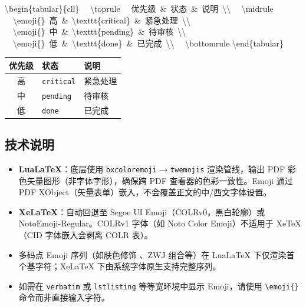 \documentclass[redline, titleindent, zhlineskip]{gbt9704}
\begin{document}
\begin{center}
\begin{minipage}[t]{0.52\textwidth}
\raggedright\small\ttfamily
\textbackslash begin\{tabular\}\{cll\}\newline
\ \ \textbackslash toprule\newline
\ \ 优先级\ \&\ 状态\ \&\ 说明\ \textbackslash\textbackslash\newline
\ \ \textbackslash midrule\newline
\ \ \textbackslash emoji\{\}\ 高\ \&\ \textbackslash texttt\{critical\}\ \&\ 紧急处理\ \textbackslash\textbackslash\newline
\ \ \textbackslash emoji\{\}\ 中\ \&\ \textbackslash texttt\{pending\}\ \&\ 待审核\ \textbackslash\textbackslash\newline
\ \ \textbackslash emoji\{\}\ 低\ \&\ \textbackslash texttt\{done\}\ \&\ 已完成\ \textbackslash\textbackslash\newline
\ \ \textbackslash bottomrule\newline
\textbackslash end\{tabular\}
\end{minipage}
\hfill
\begin{minipage}[t]{0.40\textwidth}
\centering
\begin{tabular}{cll}
\toprule
优先级 & 状态 & 说明 \\
\midrule
\emoji{🔴} 高 & \texttt{critical} & 紧急处理 \\
\emoji{🟡} 中 & \texttt{pending}  & 待审核 \\
\emoji{🟢} 低 & \texttt{done}     & 已完成 \\
\bottomrule
\end{tabular}
\end{minipage}
\end{center}

\subsection{技术说明}
\begin{itemize}
  \item \textbf{LuaLaTeX}：底层使用 \texttt{bxcoloremoji} → \texttt{twemojis} 渲染管线，输出 PDF 彩色矢量图形（非字体字形），确保跨 PDF 查看器的色彩一致性。Emoji 通过 PDF XObject（矢量表单）嵌入，不会覆盖正文的中/西文字体设置。
  \item \textbf{XeLaTeX}：自动回退至 Segoe UI Emoji（COLRv0，黑白轮廓）或 NotoEmoji-Regular。COLRv1 字体（如 Noto Color Emoji）不适用于 XeTeX（CID 字体嵌入会剥离 COLR 表）。
  \item 多码点 Emoji 序列（如肤色修饰 、ZWJ 组合等）在 LuaLaTeX 下仅渲染首个基字符；XeLaTeX 下由系统字体原生支持完整序列。
  \item 如需在 \texttt{verbatim} 或 \texttt{lstlisting} 等等宽环境中显示 Emoji，请使用 \verb|\emoji{}| 命令而非直接输入字符。
\end{itemize}
\end{document}
